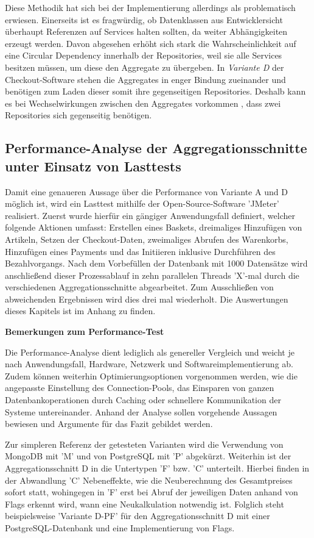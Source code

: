 Diese Methodik hat sich bei der Implementierung allerdings als problematisch erwiesen. Einerseits ist es fragwürdig, ob Datenklassen aus Entwicklersicht überhaupt Referenzen auf Services halten sollten, da weiter Abhängigkeiten erzeugt werden. Davon abgesehen erhöht sich stark die Wahrscheinlichkeit auf eine Circular Dependency innerhalb der Repositories, weil sie alle Services besitzen müssen, um diese den Aggregate zu übergeben. In \emph{Variante D} der Checkout-Software stehen die Aggregates in enger Bindung zueinander und benötigen zum Laden dieser somit ihre gegenseitigen Repositories. Deshalb kann es bei Wechselwirkungen zwischen den Aggregates vorkommen , dass zwei Repositories sich gegenseitig benötigen.

\subsection{Performance-Analyse der Aggregationsschnitte unter Einsatz von Lasttests}

Damit eine genaueren Aussage über die Performance von Variante A und D möglich ist, wird ein Lasttest mithilfe der Open-Source-Software 'JMeter' realisiert. Zuerst wurde hierfür ein gängiger Anwendungsfall definiert, welcher folgende Aktionen umfasst: Erstellen eines Baskets, dreimaliges Hinzufügen von Artikeln, Setzen der Checkout-Daten, zweimaliges Abrufen des Warenkorbs, Hinzufügen eines Payments und das Initiieren inklusive Durchführen des Bezahlvorgangs. Nach dem Vorbefüllen der Datenbank mit 1000 Datensätze wird anschließend dieser Prozessablauf in zehn parallelen Threads 'X'-mal durch die verschiedenen Aggregationsschnitte abgearbeitet. Zum Ausschließen von abweichenden Ergebnissen wird dies drei mal wiederholt. Die Auswertungen dieses Kapitels ist im Anhang zu finden.

\textbf{Bemerkungen zum Performance-Test}

Die Performance-Analyse dient lediglich als genereller Vergleich und weicht je nach Anwendungsfall, Hardware, Netzwerk und Softwareimplementierung ab. Zudem können weiterhin Optimierungsoptionen vorgenommen werden, wie die angepasste Einstellung des \Gls{Connection-Pool}s, das Einsparen von ganzen Datenbankoperationen durch Caching oder schnellere Kommunikation der Systeme untereinander. Anhand der Analyse sollen vorgehende Aussagen bewiesen und Argumente für das Fazit gebildet werden.

Zur simpleren Referenz der getesteten Varianten wird die Verwendung von MongoDB mit 'M' und von PostgreSQL mit 'P' abgekürzt. Weiterhin ist der Aggregationsschnitt D in die Untertypen 'F' bzw. 'C' unterteilt. Hierbei finden in der Abwandlung 'C' Nebeneffekte, wie die Neuberechnung des Gesamtpreises sofort statt, wohingegen in 'F' erst bei Abruf der jeweiligen Daten anhand von Flags erkennt wird, wann eine Neukalkulation notwendig ist. Folglich steht beispielsweise 'Variante D-PF' für den Aggregationsschnitt D mit einer PostgreSQL-Datenbank und eine Implementierung von Flags.

